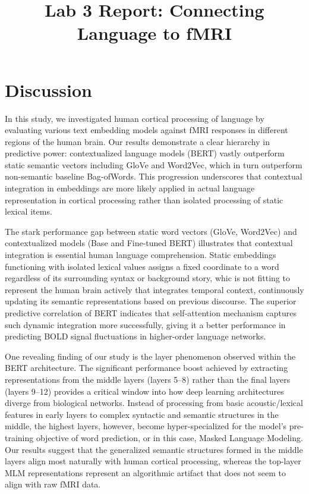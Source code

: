 \documentclass[letterpaper,11pt]{article}
\title{Lab 3 Report: Connecting Language to fMRI\\
       }
\author{}
\date{}
\begin{document}
\maketitle



\graphicspath{{results/regression/}}



\graphicspath{{results/interpretation/}}



\graphicspath{{results/stability/}}



\section{Discussion}
In this study, we investigated human cortical processing of language by evaluating various text embedding models against fMRI responses in different regions of the human brain. Our results demonstrate a clear hierarchy in predictive power: contextualized language models (BERT) vastly outperform static semantic vectors including GloVe and Word2Vec, which in turn outperform non-semantic baseline Bag-ofWords. This progression underscores that contextual integration in embeddings are more likely applied in actual language representation in cortical processing rather than isolated processing of static lexical items.


The stark performance gap between static word vectors (GloVe, Word2Vec) and contextualized models (Base and Fine-tuned BERT) illustrates that contextual integration is essential human language comprehension. Static embeddings functioning with isolated lexical values assigns a fixed coordinate to a word regardless of its surrounding syntax or background story, whic is not fitting to represent the human brain actively that integrates temporal context, continuously updating its semantic representations based on previous discourse. The superior predictive correlation of BERT indicates that self-attention mechanism captures such dynamic integration more successfully, giving it a better performance in predicting BOLD signal fluctuations in higher-order language networks.


One revealing finding of our study is the layer phenomenon observed within the BERT architecture. The significant performance boost achieved by extracting representations from the middle layers (layers 5--8) rather than the final layers (layers 9--12) provides a critical window into how deep learning architectures diverge from biological networks. Instead of processing from basic acoustic/lexical features in early layers to complex syntactic and semantic structures in the middle, the highest layers, however, become hyper-specialized for the model's pre-training objective of word prediction, or in this case, Masked Language Modeling. Our results suggest that the generalized semantic structures formed in the middle layers align most naturally with human cortical processing, whereas the top-layer MLM representations represent an algorithmic artifact that does not seem to align with raw fMRI data.
\end{document}
